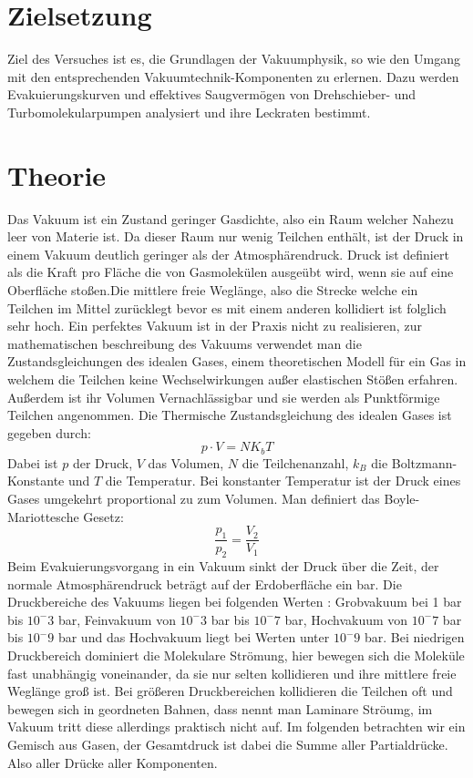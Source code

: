 
\section{Zielsetzung}
\label{sec:Zielsetzung}
Ziel des Versuches ist es, die Grundlagen der Vakuumphysik, so wie den Umgang mit
den entsprechenden Vakuumtechnik-Komponenten zu erlernen. Dazu werden Evakuierungskurven und effektives Saugvermögen 
von Drehschieber- und Turbomolekularpumpen analysiert und ihre Leckraten bestimmt.


\section{Theorie}
\label{sec:Theorie}

Das Vakuum ist ein Zustand geringer Gasdichte, also ein Raum welcher Nahezu leer von Materie ist.
Da dieser Raum nur wenig Teilchen enthält, ist der Druck in einem Vakuum deutlich geringer als der Atmosphärendruck.
Druck ist definiert als die Kraft pro Fläche die von Gasmolekülen ausgeübt wird, wenn sie auf
eine Oberfläche stoßen.Die mittlere freie Weglänge, also die Strecke welche ein Teilchen im Mittel zurücklegt bevor es
mit einem anderen kollidiert ist folglich sehr hoch. Ein perfektes Vakuum ist in der Praxis nicht zu realisieren, zur mathematischen 
beschreibung des Vakuums verwendet man die Zustandsgleichungen des idealen Gases, einem theoretischen Modell für ein 
Gas in welchem die Teilchen keine Wechselwirkungen außer elastischen Stößen erfahren. Außerdem ist ihr Volumen Vernachlässigbar 
und sie werden als Punktförmige Teilchen angenommen.
Die Thermische Zustandsgleichung des idealen Gases ist gegeben durch:
\begin{equation}
     p \cdot V=NK_bT 
\end{equation}  
Dabei ist \( p \) der Druck, \( V \) das Volumen, \( N \) die Teilchenanzahl, \( k_B \) die Boltzmann-Konstante
 und \( T \) die Temperatur.
Bei konstanter Temperatur ist der Druck eines Gases umgekehrt proportional zu zum Volumen. 
Man definiert das Boyle-Mariottesche Gesetz:
\begin{equation}
    \frac{p_1}{p_2}=  \frac{V_2}{V_1} 
\end{equation}
Beim Evakuierungsvorgang in ein Vakuum sinkt der Druck über die Zeit, der normale Atmosphärendruck beträgt auf der Erdoberfläche
ein bar. Die Druckbereiche des Vakuums liegen bei folgenden Werten :
Grobvakuum bei 1 bar bis $10^-3$ bar, Feinvakuum von $10^-3$ bar bis $10^-7$ bar, Hochvakuum von $10^-7$ bar bis $10^-9$ bar und
das Hochvakuum liegt bei Werten unter $10^-9$ bar.
Bei niedrigen Druckbereich dominiert die Molekulare Strömung, hier bewegen sich die Moleküle fast unabhängig voneinander,
da sie nur selten kollidieren und ihre mittlere freie Weglänge groß ist. Bei größeren Druckbereichen kollidieren die Teilchen oft 
und bewegen sich in geordneten Bahnen, dass nennt man Laminare Ströumg, im Vakuum tritt diese allerdings praktisch nicht auf.
Im folgenden betrachten wir ein Gemisch aus Gasen, der Gesamtdruck ist dabei die Summe aller Partialdrücke. Also aller
Drücke aller Komponenten.




\cite{sample}
